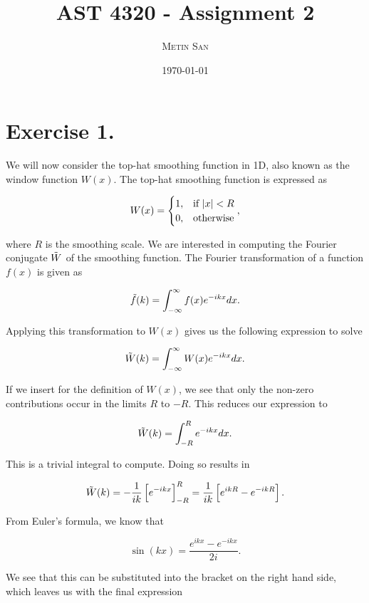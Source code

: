 \documentclass[a4paper,10pt]{article}
\title{AST 4320 - Assignment 2
}
\date{\normalsize{\textsc{\mydate\today}} }
\author{\textsc{\small{Metin San}}}
\begin{document}
\maketitle

\bigskip

\section*{Exercise 1.}

We will now consider the top-hat smoothing function in 1D, also known as the window function $W(x)$. The top-hat smoothing function is expressed as

\begin{equation}\label{eq:1}
    W(x) = 
    \begin{cases}
    1, & \text{if } \abs{x} < R\\
    0, & \text{otherwise}
    \end{cases},
\end{equation}

\noindent where $R$ is the smoothing scale. We are interested in computing the Fourier conjugate $\Tilde{W}$ of the smoothing function. The Fourier transformation of a function $f(x)$ is given as

\begin{equation}\label{eq:2}
    \Tilde{f}(k) = \int_{-\infty}^{\infty} f(x) e^{-ikx} dx.
\end{equation}

\noindent Applying this transformation to $W(x)$ gives us the following expression to solve

\[
    \Tilde{W}(k) = \int_{-\infty}^{\infty} W(x) e^{-ikx} dx.
\]

\noindent If we insert for the definition of $W(x)$, we see that only the non-zero contributions occur in the limits $R$ to $-R$. This reduces our expression to

\[
    \Tilde{W}(k) = \int_{-R}^{R} e^{-ikx} dx.
\]

\noindent This is a trivial integral to compute. Doing so results in

\[
    \Tilde{W}(k) = -\frac{1}{ik} \left[ e^{-ikx} \right]_{-R}^R = \frac{1}{ik} \left[ e^{ikR} - e^{-ikR} \right].
\]

\noindent From Euler's formula, we know that 

\[
    \sin(kx) = \frac{e^{ikx} - e^{-ikx}}{2i}.
\]

\noindent We see that this can be substituted into the bracket on the right hand side, which leaves us with the final expression
\end{document}

